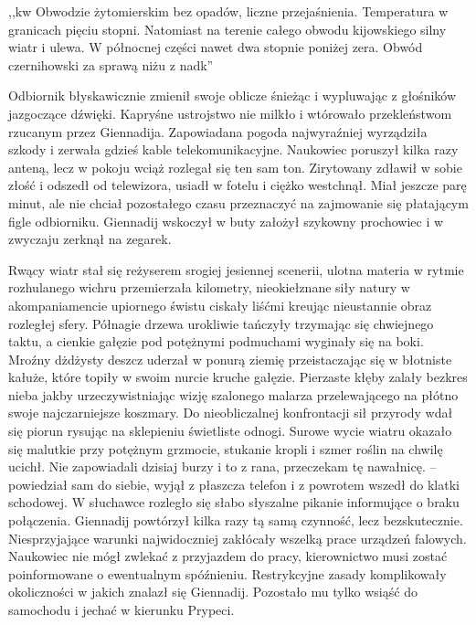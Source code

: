 \documentclass[../MAIN.tex]{subfiles}
\begin{document}
,,\3kw Obwodzie żytomierskim bez opadów, liczne przejaśnienia. Temperatura w granicach pięciu stopni. Natomiast na terenie całego obwodu kijowskiego silny wiatr i ulewa. W północnej części nawet dwa stopnie poniżej zera. Obwód czernihowski za sprawą niżu z nad\3k'' 

Odbiornik błyskawicznie zmienił swoje oblicze śnieżąc i wypluwając z głośników jazgoczące dźwięki. Kapryśne ustrojstwo nie milkło i wtórowało przekleństwom rzucanym przez Giennadija. Zapowiadana pogoda najwyraźniej wyrządziła szkody i zerwała gdzieś kable telekomunikacyjne. Naukowiec poruszył kilka razy anteną, lecz w pokoju wciąż rozlegał się ten sam ton. Zirytowany zdławił w sobie złość i odszedł od telewizora, usiadł w fotelu i ciężko westchnął. Miał jeszcze parę minut, ale nie chciał pozostałego czasu przeznaczyć na zajmowanie się płatającym figle odbiorniku. Giennadij wskoczył w buty założył szykowny prochowiec i w zwyczaju zerknął na zegarek. 

Rwący wiatr stał się reżyserem srogiej jesiennej scenerii, ulotna materia w rytmie rozhulanego wichru przemierzała kilometry, nieokiełznane siły natury w akompaniamencie upiornego świstu ciskały liśćmi kreując nieustannie obraz rozległej sfery. Półnagie drzewa urokliwie tańczyły trzymając się chwiejnego taktu, a cienkie gałęzie pod potężnymi podmuchami wyginały się na boki. Mroźny dżdżysty deszcz uderzał w ponurą ziemię przeistaczając się w błotniste kałuże, które topiły w swoim nurcie kruche gałęzie. Pierzaste kłęby zalały bezkres nieba jakby urzeczywistniając wizję szalonego malarza przelewającego na płótno swoje najczarniejsze koszmary. Do nieobliczalnej konfrontacji sił przyrody wdał się piorun rysując na sklepieniu świetliste odnogi. Surowe wycie wiatru okazało się malutkie przy potężnym grzmocie, stukanie kropli i szmer roślin na chwilę ucichł. 
% 
\sx Nie zapowiadali dzisiaj burzy i to z rana, przeczekam tę nawałnicę. -- powiedział sam do siebie, wyjął z płaszcza telefon i z powrotem wszedł do klatki schodowej. 
\qd
W słuchawce rozległo się słabo słyszalne pikanie informujące o braku połączenia. Giennadij powtórzył kilka razy tą samą czynność, lecz bezskutecznie. Niesprzyjające warunki najwidoczniej zakłócały wszelką prace urządzeń falowych. Naukowiec nie mógł zwlekać z przyjazdem do pracy, kierownictwo musi zostać poinformowane o ewentualnym spóźnieniu. Restrykcyjne zasady komplikowały okoliczności w jakich znalazł się Giennadij. Pozostało mu tylko wsiąść do samochodu i jechać w kierunku Prypeci. 
\end{document}
